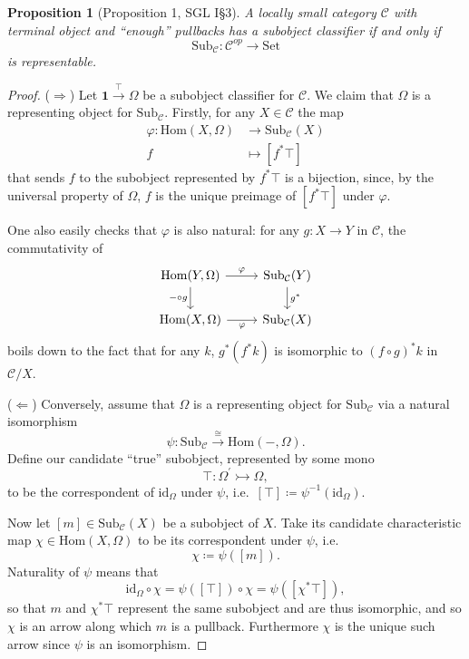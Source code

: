 \documentclass[a4paper, 11pt]{article}
\newcommand{\id}{\mathrm{id}}
\newcommand{\unit}{\mathbf{1}}
\newcommand{\Hom}{\mathrm{Hom}}
\newcommand{\Set}{\mathrm{Set}}
\newcommand{\Sub}{\mathrm{Sub}}
\newtheorem{prop}[theorem]{Proposition}
\theoremstyle{definition}
\theoremstyle{remark}
\begin{document}
\begin{prop}[Proposition 1, SGL I\S3]
    A locally small category $\mathcal C$ with terminal object and ``enough'' pullbacks has a subobject classifier if and only if
    \[ \Sub_{\mathcal C} \colon \mathcal C^{op} \rightarrow \Set \]
    is representable.
\end{prop}

\begin{proof}
\noindent ($\Rightarrow$)
Let $\unit \xrightarrow{\top} \Omega$ be a subobject classifier for $\mathcal C$.
We claim that $\Omega$ is a representing object for $\Sub_{\mathcal C}$.
Firstly, for any $X \in \mathcal C$ the map
\begin{align*}
    \varphi \colon \Hom(X , \Omega) & \rightarrow \Sub_{\mathcal C}(X) \\
    f & \mapsto [f^*\top]
\end{align*}
that sends $f$ to the subobject represented by $f^*\top$ is a bijection, since, by the universal property of $\Omega$, $f$ is the unique preimage of $[f^*\top]$ under $\varphi$.

One also easily checks that $\varphi$ is also natural: for any $g \colon X \rightarrow Y$ in $\mathcal C$, the commutativity of
\[
\begin{tikzcd}
    \Hom(Y, \Omega) \ar[d, swap, "-\circ g"]
                    \ar[r, "\varphi"]        & \Sub_{\mathcal C}(Y) \ar[d, "g^*"] \\
    \Hom(X, \Omega) \ar[r, swap, "\varphi"]  & \Sub_{\mathcal C}(X)
\end{tikzcd}
\]
boils down to the fact that for any $k$, $g^*(f^*k)$ is isomorphic to $(f \circ g)^*k$ in $\mathcal C/X$.

($\Leftarrow$)
Conversely, assume that $\Omega$ is a representing object for $\Sub_{\mathcal C}$ via a natural isomorphism
\[ \psi \colon \Sub_{\mathcal C} \xrightarrow{\cong} \Hom(-,\Omega). \]
Define our candidate ``true'' subobject, represented by some mono
\[ \top \colon \Omega^\prime \rightarrowtail \Omega, \]
to be the correspondent of $\id_\Omega$ under $\psi$, i.e.\ $[\top] \coloneqq \psi^{-1}(\id_\Omega)$.

Now let $[m] \in \Sub_{\mathcal C}(X)$ be a subobject of $X$.
Take its candidate characteristic map $\chi \in \Hom(X, \Omega)$ to be its correspondent under $\psi$, i.e.\
\[ \chi \coloneqq \psi([m]). \]
Naturality of $\psi$ means that
\[ \id_\Omega \circ \chi = \psi([\top]) \circ \chi = \psi([\chi^*\top]), \]
so that $m$ and $\chi^*\top$ represent the same subobject and are thus isomorphic, and so $\chi$ is an arrow along which $m$ is a pullback.
Furthermore $\chi$ is the unique such arrow since $\psi$ is an isomorphism.


\end{proof}
\end{document}
